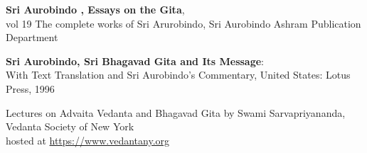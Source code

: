 \documentclass[a4paper]{article}
\begin{document}
\begin{thebibliography}{99}
 {\textbf{Sri Aurobindo , Essays on the Gita}, 
\\vol 19 The complete works of Sri Arurobindo, Sri Aurobindo Ashram Publication Department}

 {\textbf{Sri Aurobindo, Sri Bhagavad Gita and Its Message}: 
\\With Text Translation and Sri Aurobindo's Commentary, United States: Lotus Press, 1996}

 {Lectures on Advaita Vedanta and Bhagavad Gita by Swami Sarvapriyananda, Vedanta Society of New York 
\\hosted at \href{https://www.vedantany.org}{https://www.vedantany.org}}

\end{thebibliography}
\end{document}
